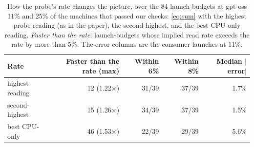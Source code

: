 \begin{table}[t]\centering\footnotesize
\caption{How the probe's rate changes the picture, over the 84 launch-budgets at gpt-oss 11\% and 25\% of the machines that passed our checks: \cref{eq:sum} with the highest probe reading (as in the paper), the second-highest, and the best CPU-only reading. \emph{Faster than the rate}: launch-budgets whose implied read rate exceeds the rate by more than 5\%. The error columns are the consumer launches at 11\%.}\label{tab:robust}
\setlength\tabcolsep{3pt}\begin{tabular}{@{}lrrrr@{}}\toprule
Rate & Faster than the rate (max) & Within 6\% & Within 8\% & Median $|$error$|$ \\\midrule
highest reading & 12 (1.22$\times$) & 31/39 & 37/39 & 1.7\% \\
second-highest & 15 (1.26$\times$) & 34/39 & 37/39 & 1.5\% \\
best CPU-only & 46 (1.53$\times$) & 22/39 & 29/39 & 5.6\% \\
\bottomrule\end{tabular}\end{table}
